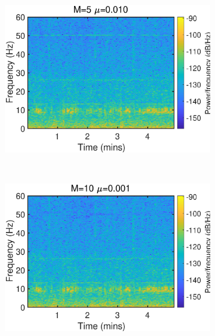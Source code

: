 \begin{figure}[htb]
\begin{subfigure}[b]{0.32\textwidth}
     \includegraphics[width=\textwidth]{fig/23/23d4.eps}
    \end{subfigure}
    \\
    \hspace{-0.4cm}
    \begin{subfigure}[b]{0.32\textwidth}
     \centering
     \includegraphics[width=\textwidth]{fig/23/23d5.eps}
    \end{subfigure}
    \hspace{-0.4cm}
    \begin{subfigure}[b]{0.32\textwidth}
     \centering

\end{subfigure}
\end{figure}
